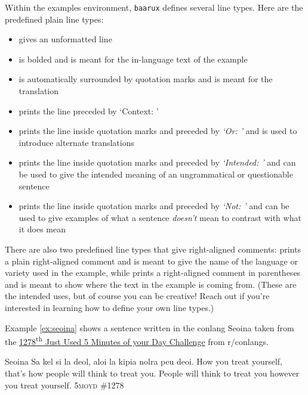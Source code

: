 Within the examples environment, \texttt{baarux} defines several line types. Here are the predefined plain line types:
\begin{itemize}
    \item {} gives an unformatted line
    \item {} is bolded and is meant for the in-language text of the example
    \item {} is automatically surrounded by quotation marks and is meant for the translation
    \item {} prints the line preceded by `Context: '
    \item {} prints the line inside quotation marks and preceded by \textit{`Or: '} and is used to introduce alternate translations
    \item {} prints the line inside quotation marks and preceded by \textit{`Intended: '} and can be used to give the intended meaning of an ungrammatical or questionable sentence 
    \item {} prints the line inside quotation marks and preceded by \textit{`Not: '} and can be used to give examples of what a sentence \emph{doesn't} mean to contrast with what it does mean
\end{itemize} 
There are also two predefined line types that give right-aligned comments:  prints a plain right-aligned comment and is meant to give the name of the language or variety used in the example, while  prints a right-aligned comment in parentheses and is meant to show where the text in the example is coming from. (These are the intended uses, but of course you can be creative! Reach out if you're interested in learning how to define your own line types.)

Example \ref{ex:seoina} shows a sentence written in the conlang Seoina taken from the \href{https://www.reddit.com/r/conlangs/comments/haaf0c/1278th_just_used_5_minutes_of_your_day/} {1278\textsuperscript{th} Just Used 5 Minutes of your Day Challenge} from r/conlangs. 

\begin{examples}
    \ex \label{ex:seoina}
    \lect Seoina
    \script Sa kel si la deol, aloi la kipia nolra peu deoi.
    \tr How you treat yourself, that's how people will think to treat you.
    \alt People will think to treat you however you treat yourself.
    \source \textsc{5moyd} \#1278
\end{examples}

